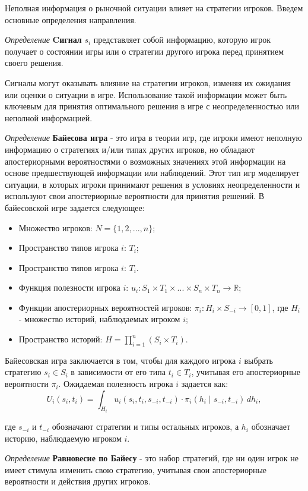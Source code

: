 Неполная информация о рыночной ситуации влияет на стратегии игроков.
Введем основные определения направления. 

\textit{Определение} \textbf{Cигнал} $s_i$ представляет собой информацию, которую игрок получает о состоянии игры или о стратегии другого игрока перед принятием своего решения. 

Сигналы могут оказывать влияние на стратегии игроков, изменяя их ожидания или оценки о ситуации в игре. Использование такой информации может быть ключевым для принятия оптимального решения в игре с неопределенностью или неполной информацией.




\textit{Определение} \textbf{Байесова игра}\cite{harsanyi1967games} \cite{harsanyi1968games}\cite{harsanyi1968bayesian} - это игра в теории игр, где игроки имеют неполную информацию о стратегиях и/или типах других игроков, но обладают апостериорными вероятностями о возможных значениях этой информации на основе предшествующей информации или наблюдений. Этот тип игр моделирует ситуации, в которых игроки принимают решения в условиях неопределенности и используют свои апостериорные вероятности для принятия решений.
В байесовской игре задается следующее:

\begin{itemize}
    \item Множество игроков: \( N = \{1, 2, ..., n\} \);
    \item Пространство типов игрока \(i\): \(T_i\);
    \item Пространство типов игрока \(i\): \(T_i\).
    \item Функция полезности игрока \(i\): \(u_i: S_1 \times T_1 \times ... \times S_n \times T_n \rightarrow \mathbb{R}\);
    \item Функции апостериорных вероятностей игроков: \(\pi_i: H_i \times S_{-i} \rightarrow [0, 1]\), где \(H_i\) - множество историй, наблюдаемых игроком \(i\);
    \item Пространство историй: \(H = \prod_{i=1}^{n} (S_i \times T_i)\).
\end{itemize}


Байесовская игра заключается в том, чтобы для каждого игрока \(i\) выбрать стратегию \(s_i \in S_i\) в зависимости от его типа \(t_i \in T_i\), учитывая его апостериорные вероятности \(\pi_i\). Ожидаемая полезность игрока \(i\) задается как:
\[ U_i(s_i, t_i) = \int_{H_i} u_i(s_i, t_i, s_{-i}, t_{-i}) \cdot \pi_i(h_i \mid s_{-i}, t_{-i}) \, dh_i ,\]


где \(s_{-i}\) и \(t_{-i}\) обозначают стратегии и типы остальных игроков, а \(h_i\) обозначает историю, наблюдаемую игроком \(i\).


\textit{Определение} \textbf{Равновесие по Байесу} - это набор стратегий, где ни один игрок не имеет стимула изменить свою стратегию, учитывая свои апостериорные вероятности и действия других игроков.
